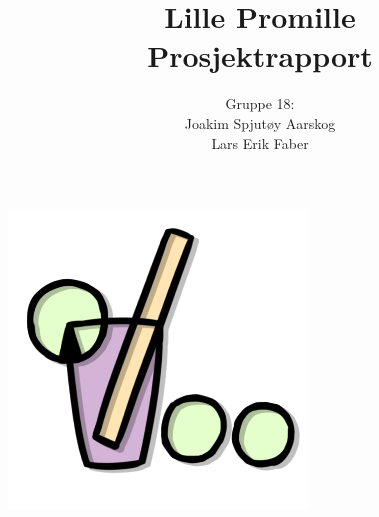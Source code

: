 \documentclass[12pt]{article}
\begin{document}
\title{%
    Lille Promille\\
    \large Prosjektrapport}
\author{
    Gruppe 18:\\
    Joakim Spjutøy Aarskog\\
    Lars Erik Faber}
\date{}
\maketitle
\begin{center}
    \includegraphics[scale=3]{images/lille_promille_logo.png}    
\end{center}
\thispagestyle{empty}
\newpage
\tableofcontents
\thispagestyle{empty}
\newpage
\setcounter{page}{1}








\end{document}
